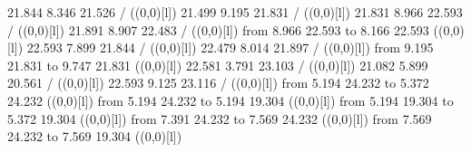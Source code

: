 {{\color[rgb]{0,0,0} 21.844  8.346 21.526 /
}%
%
%
\linethickness=1pt
\setplotsymbol ({\makebox(0,0)[l]{\tencirc{}}})
{\color[rgb]{0,0,0} 21.499  9.195 21.831 /
}%
%
%
\linethickness=1pt
\setplotsymbol ({\makebox(0,0)[l]{\tencirc{}}})
{\color[rgb]{0,0,0} 21.831  8.966 22.593 /
}%
%
%
\linethickness=1pt
\setplotsymbol ({\makebox(0,0)[l]{\tencirc{}}})
{\color[rgb]{0,0,0} 21.891  8.907 22.483 /
}%
%
%
\linethickness=1pt
\setplotsymbol ({\makebox(0,0)[l]{\tencirc{}}})
{\color[rgb]{0,0,0}\putrule from  8.966 22.593 to  8.166 22.593
}%
%
%
\linethickness=1pt
\setplotsymbol ({\makebox(0,0)[l]{\tencirc{}}})
{\color[rgb]{0,0,0} 22.593  7.899 21.844 /
}%
%
%
\linethickness=1pt
\setplotsymbol ({\makebox(0,0)[l]{\tencirc{}}})
{\color[rgb]{0,0,0} 22.479  8.014 21.897 /
}%
%
%
\linethickness=1pt
\setplotsymbol ({\makebox(0,0)[l]{\tencirc{}}})
{\color[rgb]{0,0,0}\putrule from  9.195 21.831 to  9.747 21.831
}%
%
%
\linethickness=1pt
\setplotsymbol ({\makebox(0,0)[l]{\tencirc{}}})
{\color[rgb]{0,0,0} 22.581  3.791 23.103 /
}%
%
%
\linethickness=1pt
\setplotsymbol ({\makebox(0,0)[l]{\tencirc{}}})
{\color[rgb]{0,0,0} 21.082  5.899 20.561 /
}%
%
%
\linethickness=1pt
\setplotsymbol ({\makebox(0,0)[l]{\tencirc{}}})
{\color[rgb]{0,0,0} 22.593  9.125 23.116 /
}%
%
%
\linethickness=1pt
\setplotsymbol ({\makebox(0,0)[l]{\tencirc{}}})
{\color[rgb]{0,0,0}\putrule from  5.194 24.232 to  5.372 24.232
}%
%
%
\linethickness=1pt
\setplotsymbol ({\makebox(0,0)[l]{\tencirc{}}})
{\color[rgb]{0,0,0}\putrule from  5.194 24.232 to  5.194 19.304
}%
%
%
\linethickness=1pt
\setplotsymbol ({\makebox(0,0)[l]{\tencirc{}}})
{\color[rgb]{0,0,0}\putrule from  5.194 19.304 to  5.372 19.304
}%
%
%
\linethickness=1pt
\setplotsymbol ({\makebox(0,0)[l]{\tencirc{}}})
{\color[rgb]{0,0,0}\putrule from  7.391 24.232 to  7.569 24.232
}%
%
%
\linethickness=1pt
\setplotsymbol ({\makebox(0,0)[l]{\tencirc{}}})
{\color[rgb]{0,0,0}\putrule from  7.569 24.232 to  7.569 19.304
}%
%
%
\linethickness=1pt
\setplotsymbol ({\makebox(0,0)[l]{\tencirc{}}})
}

